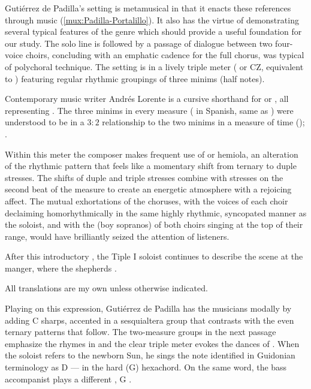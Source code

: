 Gutiérrez de Padilla's setting is metamusical in that it enacts these
references through music (\cref{mux:Padilla-Portalillo}).
It also has the virtue of demonstrating several typical features of the genre
which should provide a useful foundation for our study.
The solo line is followed by a passage of dialogue between two four-voice
choirs, concluding with an emphatic cadence for the full chorus, was typical of
polychoral technique.
The setting is in a lively triple meter (\meterCZ{} or CZ, equivalent to
\meterCThree) featuring regular rhythmic groupings of three minims (half
notes).
\begin{Footnote}
    Contemporary music writer Andrés Lorente \meterCZ{} is a cursive shorthand
    for \meterCThreeTwo or \meterCThree, all representing .
    The three minims in every measure ( in Spanish, same as
    ) were understood to be in a $3:2$ relationship to the two
    minims in a measure of  time ();
    \autocites
    [156, 165, 210]{Lorente:Porque}
    [537]{Cerone:Melopeo}
    [\XXX]{Cashner:WLSCM32}.
\end{Footnote}
Within this meter the composer makes frequent use of  or
hemiola, an alteration of the rhythmic pattern that feels like a momentary
shift from ternary to duple stresses.
The shifts of duple and triple stresses combine with stresses on the second
beat of the measure to create an energetic atmosphere with a rejoicing affect.  
The mutual exhortations of the choruses, with the voices of each choir declaiming
homorhythmically in the same highly rhythmic, syncopated manner as the soloist,
and with the  (boy sopranos) of both choirs singing at the top of
their range, would have brilliantly seized the attention of listeners.

After this introductory , the Tiple I soloist continues to
describe the scene at the manger, where the shepherds .%
\begin{Footnote}
    All translations are my own unless otherwise indicated.
\end{Footnote}
Playing on this expression, Gutiérrez de Padilla has the musicians
 modally by adding C sharps, accented in a sesquialtera group that
contrasts with the even ternary patterns that follow.
The two-measure groups in the next passage emphasize the rhymes in
 and the clear triple meter evokes the
dances of .
When the soloist refers to the newborn Sun, he sings the note identified in
Guidonian terminology as D --- in the hard (G)
hexachord.  
On the same word, the bass accompanist plays a different , G
.

